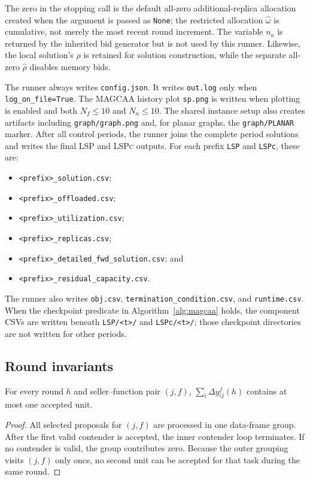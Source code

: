 The zero in the stopping call is the default all-zero additional-replica
allocation created when the argument is passed as \texttt{None}; the
restricted allocation $\widehat\omega$ is cumulative, not merely the most
recent round increment. The variable $n_a$ is returned by the inherited bid
generator but is not used by this runner. Likewise, the local solution's
$\rho$ is retained for solution construction, while the separate all-zero
$\widehat\rho$ disables memory bids.

The runner always writes \texttt{config.json}. It writes \texttt{out.log}
only when \texttt{log\_on\_file=True}. The MAGCAA history plot
\texttt{sp.png} is written when plotting is enabled and both $N_f\le10$ and
$N_n\le10$. The shared instance setup also creates artifacts including
\texttt{graph/graph.png} and, for planar graphs, the \texttt{graph/PLANAR}
marker. After all control periods, the runner joins the complete period
solutions and writes the final \textsc{LSP} and \textsc{LSPc} outputs. For
each prefix \texttt{LSP} and \texttt{LSPc}, these
are:
\begin{itemize}
  \item \texttt{<prefix>\_solution.csv};
  \item \texttt{<prefix>\_offloaded.csv};
  \item \texttt{<prefix>\_utilization.csv};
  \item \texttt{<prefix>\_replicas.csv};
  \item \texttt{<prefix>\_detailed\_fwd\_solution.csv}; and
  \item \texttt{<prefix>\_residual\_capacity.csv}.
\end{itemize}
The runner also writes
\texttt{obj.csv}, \texttt{termination\_condition.csv}, and
\texttt{runtime.csv}. When the checkpoint predicate in
Algorithm~\ref{alg:magcaa} holds, the component CSVs are written beneath
\texttt{LSP/<t>/} and \texttt{LSPc/<t>/}; those checkpoint directories are
not written for other periods.

\subsection{Round invariants}
\label{sec:magcaa-properties}

\begin{proposition}
\label{prop:magcaa-one-winner}
For every round $h$ and seller--function pair $(j,f)$,
$\sum_i\Delta y_{ij}^f(h)$ contains at most one accepted unit.
\end{proposition}
\begin{proof}
All selected proposals for $(j,f)$ are processed in one data-frame group.
After the first valid contender is accepted, the inner contender loop
terminates. If no contender is valid, the group contributes zero. Because
the outer grouping visits $(j,f)$ only once, no second unit can be accepted
for that task during the same round.
\end{proof}

